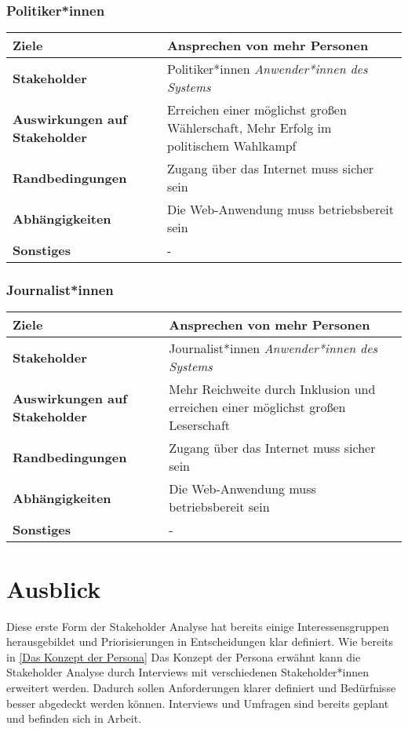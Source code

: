 \documentclass[paper=a4, parskip=half]{scrreprt}
\begin{document}
\subsection{Politiker*innen}
\begin{tabular}
	{
	|p{}
	|p{}
	|
	}
	\hline
	\textbf{Ziele}
	&Ansprechen von mehr Personen\\
	\hline
	\textbf{Stakeholder}
	&Politiker*innen
	\newline \textit{Anwender*innen des Systems}\\
	\hline
	\textbf{Auswirkungen auf Stakeholder}
	&Erreichen einer möglichst großen Wählerschaft, Mehr Erfolg im politischem Wahlkampf\\
	\hline
	\textbf{Randbedingungen}
	&Zugang über das Internet muss sicher sein\\
	\hline
	\textbf{Abhängigkeiten}
	&Die Web-Anwendung muss betriebsbereit sein\\
	\hline
	\textbf{Sonstiges}
	&-\\
	\hline
\end{tabular}

\subsection{Journalist*innen}
\begin{tabular}
	{
	|p{}
	|p{}
	|
	}
	\hline
	\textbf{Ziele}
	&Ansprechen von mehr Personen\\
	\hline
	\textbf{Stakeholder}
	&Journalist*innen
	\newline \textit{Anwender*innen des Systems}\\
	\hline
	\textbf{Auswirkungen auf Stakeholder}
	&Mehr Reichweite durch Inklusion und erreichen einer möglichst großen Leserschaft\\
	\hline
	\textbf{Randbedingungen}
	&Zugang über das Internet muss sicher sein\\
	\hline
	\textbf{Abhängigkeiten}
	&Die Web-Anwendung muss betriebsbereit sein\\
	\hline
	\textbf{Sonstiges}
	&-\\
	\hline
\end{tabular}

\chapter{Ausblick}
Diese erste Form der Stakeholder Analyse hat bereits einige Interessensgruppen herausgebildet und Priorisierungen in Entscheidungen klar definiert.
Wie bereits in \ref{Das Konzept der Persona} Das Konzept der Persona erwähnt kann die Stakeholder Analyse durch Interviews mit verschiedenen Stakeholder*innen erweitert werden. Dadurch sollen Anforderungen klarer definiert und Bedürfnisse besser abgedeckt werden können. Interviews und Umfragen sind bereits geplant und befinden sich in Arbeit. 



\printglossary
\pagebreak

\nocite{*}





\end{document}
